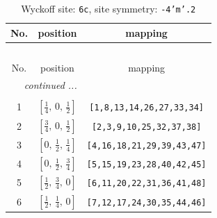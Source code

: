 \documentclass[fleqn,8pt]{jsarticle}
\begin{document}
\renewcommand{\arraystretch}{1.2}
\begin{longtable}{ccc}
\caption{Wyckoff site: {\tt 6c}, site symmetry: {\tt -4'm'.2}}
 \\
 \hline \hline
No. & position & mapping \\ \hline \endfirsthead

\multicolumn{2}{l}{\tablename\ \thetable{}} \\
 \hline \hline
No. & position & mapping \\ \hline \endhead

 \hline \hline
\multicolumn{2}{r}{\footnotesize\it continued ...} \\ \endfoot

 \hline \hline
\multicolumn{2}{r}{} \\ \endlastfoot

1 & $\left[ \frac{1}{4},\, 0,\, \frac{1}{2} \right]$ & {\tt [1,8,13,14,26,27,33,34]} \\ \hline
2 & $\left[ \frac{3}{4},\, 0,\, \frac{1}{2} \right]$ & {\tt [2,3,9,10,25,32,37,38]} \\ \hline
3 & $\left[ 0,\, \frac{1}{2},\, \frac{1}{4} \right]$ & {\tt [4,16,18,21,29,39,43,47]} \\ \hline
4 & $\left[ 0,\, \frac{1}{2},\, \frac{3}{4} \right]$ & {\tt [5,15,19,23,28,40,42,45]} \\ \hline
5 & $\left[ \frac{1}{2},\, \frac{3}{4},\, 0 \right]$ & {\tt [6,11,20,22,31,36,41,48]} \\ \hline
6 & $\left[ \frac{1}{2},\, \frac{1}{4},\, 0 \right]$ & {\tt [7,12,17,24,30,35,44,46]} \\
\end{longtable}
\renewcommand{\arraystretch}{1.2}
\end{document}

